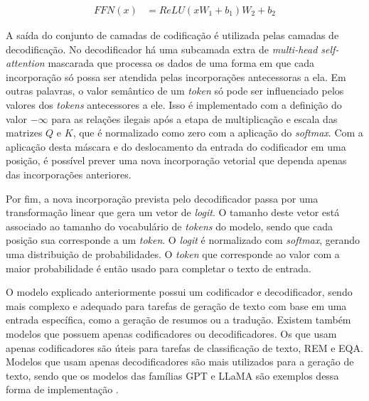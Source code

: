 \begin{align*}
      FFN(x) &= ReLU(xW_1+b_1)W_2 + b_2
\end{align*}

A saída do conjunto de camadas de codificação é utilizada pelas camadas de decodificação. No decodificador há uma subcamada extra de \textit{multi-head self-attention}
mascarada que processa os dados de uma forma em que cada incorporação só possa ser atendida pelas incorporações antecessoras a ela. Em outras palavras, o valor semântico
de um \textit{token} só pode ser influenciado pelos valores dos \textit{tokens} antecessores a ele. Isso é implementado com a definição do valor
\begin{math}-\infty\end{math} para as relações ilegais após a etapa de multiplicação e escala das matrizes \begin{math}Q\end{math} e \begin{math}K\end{math}, que é
normalizado como zero com a aplicação do \textit{softmax}. Com a aplicação desta máscara e do deslocamento da entrada do codificador em uma posição, é possível prever
uma nova incorporação vetorial que dependa apenas das incorporações anteriores.

Por fim, a nova incorporação prevista pelo decodificador passa por uma transformação linear que gera um vetor de \textit{logit}. O tamanho deste vetor está associado ao
tamanho do vocabulário de \textit{tokens} do modelo, sendo que cada posição sua corresponde a um \textit{token}. O \textit{logit} é normalizado com \textit{softmax},
gerando uma distribuição de probabilidades. O \textit{token} que corresponde ao valor com a maior probabilidade é então usado para completar o texto de entrada.


O modelo explicado anteriormente possui um codificador e decodificador, sendo mais complexo e adequado para tarefas de geração de texto com base em uma entrada específica,
como a geração de resumos ou a tradução. Existem também modelos que possuem apenas codificadores ou decodificadores. Os que usam apenas codificadores são úteis para
tarefas de classificação de texto, \ac{REM} e \ac{EQA}. Modelos que usam apenas decodificadores são mais utilizados para a geração de texto, sendo que os modelos das
famílias \ac{GPT} e \ac{LLaMA} são exemplos dessa forma de implementação \cite{llm_survey_2024}.

